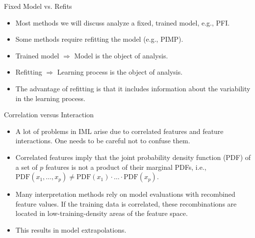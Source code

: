 \documentclass[11pt,compress,t,notes=noshow, xcolor=table]{beamer}
\begin{document}
\begin{vbframe}{Fixed Model vs. Refits}
	\begin{itemize}
		\itemsep2em
		\item Most methods we will discuss analyze a fixed, trained model, e.g., PFI.
		\item Some methods require refitting the model (e.g., PIMP).
		\item Trained model $\Rightarrow$ Model is the object of analysis.
		\item Refitting $\Rightarrow$ Learning process is the object of analysis.
		\item The advantage of refitting is that it includes information about the variability in the learning process.
	\end{itemize}
\end{vbframe}



\begin{vbframe}{Correlation versus Interaction}
\begin{itemize}
\itemsep2em
\item A lot of problems in IML arise due to correlated features and feature interactions. One needs to be careful not to confuse them.
\item Correlated features imply that the joint probability density function (PDF) of a set of $p$ features is not a product of their marginal PDFs, i.e., $\text{PDF}(x_1, \dots, x_p) \neq \text{PDF}(x_1) \cdot \ldots \cdot \text{PDF}(x_p)$.
\item
Many interpretation methods rely on model evaluations with recombined feature values. If the training data is correlated, these recombinations are located in low-training-density areas of the feature space.
\item This results in model extrapolations.
\end{itemize}
\end{vbframe}
\end{document}
